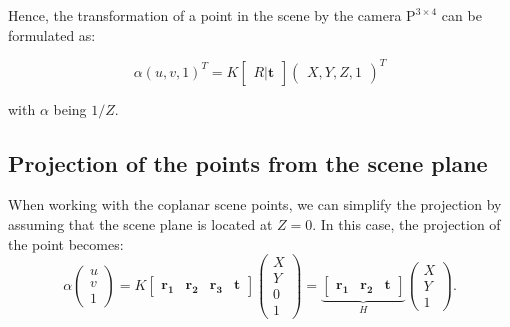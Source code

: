Hence, the transformation of a point in the scene by the camera $\mathrm{P}^{3 \times 4}$ can be formulated as:

\begin{equation}
	\alpha(u, v, 1)^{T} = K \begin{bmatrix}
		R \vert \mathbf{t}
	\end{bmatrix} \begin{pmatrix}
		X, Y, Z, 1
	\end{pmatrix}^{T}
\end{equation}

with $\alpha$ being $1 / Z$.

\subsection{Projection of the points from the scene plane}\label{sub:projection_of_the_points_from_the_scene_plane}

When working with the coplanar scene points, we can simplify the projection
by assuming that the scene plane is located at \(Z = 0\). In this case, the
projection of the point becomes:
\begin{equation}
	\alpha \begin{pmatrix}
		u \\ v \\ 1
	\end{pmatrix} = K \begin{bmatrix}
		\mathbf{r_1} & \mathbf{r_2} & \mathbf{r_3} & \mathbf{t}
	\end{bmatrix} \begin{pmatrix}
		X \\ Y \\ 0 \\ 1
	\end{pmatrix} = \underbrace{\begin{bmatrix}
			\mathbf{r_1} & \mathbf{r_2} & \mathbf{t}
		\end{bmatrix}}_{H} \begin{pmatrix}
		X \\ Y \\ 1
	\end{pmatrix}.
\end{equation}

